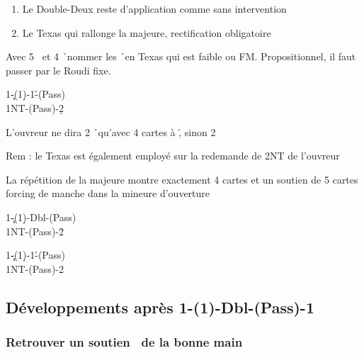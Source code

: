 \documentclass[a4paper]{article}
\begin{document}
\begin{enumerate}
\item Le Double-Deux reste d’application comme sans intervention

\item Le Texas qui rallonge la majeure, rectification obligatoire

\end{enumerate}

Avec 5 \s\ et 4 \h\ nommer les \h\ en Texas qui est faible ou FM. 
Propositionnel, il faut passer par le Roudi fixe.

\begin{bidtable}
1\c-(1\d)-1\h-(Pass)\\
1NT-(Pass)-2\d
\end{bidtable}

L’ouvreur ne dira 2 \h\ qu’avec 4 cartes à \h , sinon 2 \s 

Rem : le Texas est également employé sur la redemande de 2NT de l’ouvreur

La répétition de la majeure montre exactement 4 cartes et un soutien 
de 5 cartes forcing de manche dans la mineure d’ouverture

\begin{bidtable}
1\c-(1\d)-Dbl-(Pass)\\
1NT-(Pass)-2\h
\end{bidtable}

\begin{bidtable}
1\c-(1\d)-1\h-(Pass)\\
1NT-(Pass)-2\s
\end{bidtable}

\subsection{Développements après 1\pdfc-(1\pdfd)-Dbl-(Pass)-1\pdfh}

\subsubsection{Retrouver un soutien \pdfs\ de la bonne main}
\end{document}
